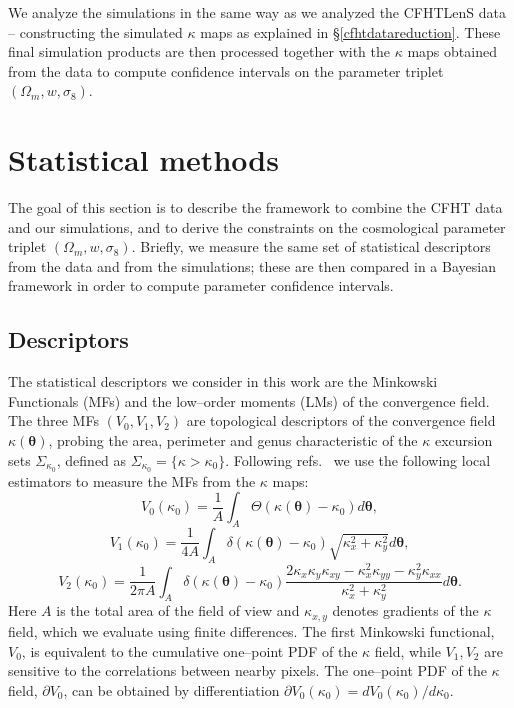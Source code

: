 \documentclass[reprint,aps,prd,superscriptaddress,showkeys,showpacs]{revtex4-1}
\begin{document}
We analyze the simulations in the same way as we analyzed the CFHTLenS
data -- constructing the simulated $\kappa$ maps as explained in
\S\ref{cfhtdatareduction}. These final simulation products are then
processed together with the $\kappa$ maps obtained from the data to
compute confidence intervals on the parameter triplet
$(\Omega_m,w,\sigma_8)$.



\section{Statistical methods}

The goal of this section is to describe the framework to combine the
CFHT data and our simulations, and to derive the constraints on the
cosmological parameter triplet $(\Omega_m,w,\sigma_8)$. Briefly, we
measure the same set of statistical descriptors from the data and from the
simulations; these are then compared in a Bayesian framework in
order to compute parameter confidence intervals.

\subsection{Descriptors}

The statistical descriptors we consider in this work are the Minkowski
Functionals (MFs) and the low--order moments (LMs) of the convergence
field. The three MFs $(V_0,V_1,V_2)$ are topological descriptors of
the convergence field $\kappa(\pmb{\theta})$, probing the area,
perimeter and genus characteristic of the $\kappa$ excursion sets
$\Sigma_{\kappa_0}$, defined as
$\Sigma_{\kappa_0}=\{\kappa>\kappa_0\}$. Following
refs.~\citep{Petri2013,MinkJan} we use the following local estimators
to measure the MFs from the $\kappa$ maps:
%
\begin{equation*}
\label{v0meas}
V_0(\kappa_0)=\frac{1}{A}\int_A\Theta(\kappa(\pmb{\theta})-\kappa_0)d\pmb{\theta},
\end{equation*}
\begin{equation}
\label{v1meas}
V_1(\kappa_0)=\frac{1}{4A}\int_A\delta(\kappa(\pmb{\theta})-\kappa_0)\sqrt{\kappa_x^2+\kappa_y^2}d\pmb{\theta},
\end{equation}
\begin{equation*}
\label{v2meas}
V_2(\kappa_0)=\frac{1}{2\pi A}\int_A\delta(\kappa(\pmb{\theta})-\kappa_0)\frac{2\kappa_x\kappa_y\kappa_{xy}-\kappa_x^2\kappa_{yy}-\kappa_y^2\kappa_{xx}}{\kappa_x^2+\kappa_y^2}d\pmb{\theta}.
\end{equation*}
%
Here $A$ is the total area of the field of view and $\kappa_{x,y}$
denotes gradients of the $\kappa$ field, which we evaluate using
finite differences. The first Minkowski functional, $V_0$, is
equivalent to the cumulative one--point PDF of the $\kappa$ field,
while $V_1,V_2$ are sensitive to the correlations between nearby
pixels. The one--point PDF of the $\kappa$ field, $\partial V_0$, can
be obtained by differentiation $\partial
V_0(\kappa_0)=dV_0(\kappa_0)/d\kappa_0$. 
\end{document}
